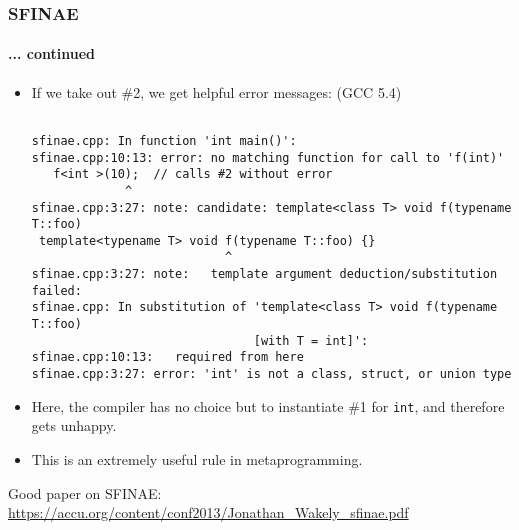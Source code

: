 \begin{frame}[fragile,t]
\frametitle{SFINAE}
\framesubtitle{... continued}
\begin{itemize}[<+->]
\item If we take out \#2, we get helpful error messages: (GCC 5.4)
{\scriptsize\begin{verbatim}

sfinae.cpp: In function 'int main()':
sfinae.cpp:10:13: error: no matching function for call to 'f(int)'
   f<int >(10);  // calls #2 without error
             ^
sfinae.cpp:3:27: note: candidate: template<class T> void f(typename T::foo)
 template<typename T> void f(typename T::foo) {}
                           ^
sfinae.cpp:3:27: note:   template argument deduction/substitution failed:
sfinae.cpp: In substitution of 'template<class T> void f(typename T::foo) 
                               [with T = int]':
sfinae.cpp:10:13:   required from here
sfinae.cpp:3:27: error: 'int' is not a class, struct, or union type
\end{verbatim}
}
\vskip 12pt

\item Here, the compiler has no choice but to instantiate \#1 for
  \texttt{int}, and therefore gets unhappy.

\item This is an extremely useful rule in metaprogramming.
\end{itemize}
\pause
\begin{center}
Good paper on SFINAE: {\scriptsize
\url{https://accu.org/content/conf2013/Jonathan_Wakely_sfinae.pdf}
}
\end{center}
\end{frame}




